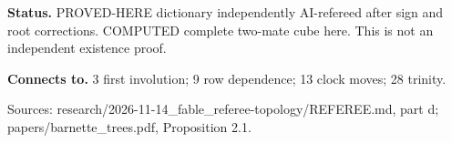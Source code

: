 \textbf{Status.} PROVED-HERE dictionary independently AI-refereed after sign and root corrections. COMPUTED complete two-mate cube here. This is not an independent existence proof.

\textbf{Connects to.} 3 first involution; 9 row dependence; 13 clock moves; 28 trinity.

{\footnotesize\raggedright Sources: research/\allowbreak{}2026-11-14\_fable\_referee-topology/\allowbreak{}REFEREE.md, part d;\allowbreak{} papers/\allowbreak{}barnette\_trees.pdf, Proposition 2.1.\par}
